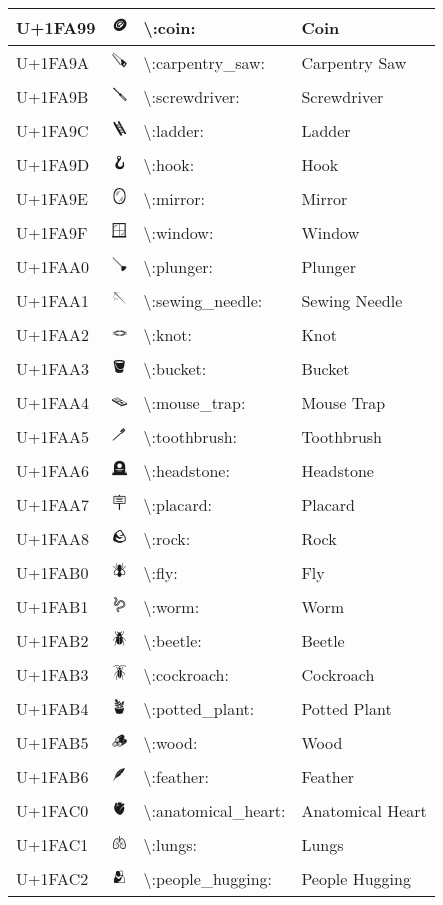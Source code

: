 \begin{table}[h]
\begin{tabulary}{\linewidth}{|L|L|L|L|}
\hline
U+1FA99 & 🪙 & {\textbackslash}:coin: & Coin \\
\hline
U+1FA9A & 🪚 & {\textbackslash}:carpentry\_saw: & Carpentry Saw \\
\hline
U+1FA9B & 🪛 & {\textbackslash}:screwdriver: & Screwdriver \\
\hline
U+1FA9C & 🪜 & {\textbackslash}:ladder: & Ladder \\
\hline
U+1FA9D & 🪝 & {\textbackslash}:hook: & Hook \\
\hline
U+1FA9E & 🪞 & {\textbackslash}:mirror: & Mirror \\
\hline
U+1FA9F & 🪟 & {\textbackslash}:window: & Window \\
\hline
U+1FAA0 & 🪠 & {\textbackslash}:plunger: & Plunger \\
\hline
U+1FAA1 & 🪡 & {\textbackslash}:sewing\_needle: & Sewing Needle \\
\hline
U+1FAA2 & 🪢 & {\textbackslash}:knot: & Knot \\
\hline
U+1FAA3 & 🪣 & {\textbackslash}:bucket: & Bucket \\
\hline
U+1FAA4 & 🪤 & {\textbackslash}:mouse\_trap: & Mouse Trap \\
\hline
U+1FAA5 & 🪥 & {\textbackslash}:toothbrush: & Toothbrush \\
\hline
U+1FAA6 & 🪦 & {\textbackslash}:headstone: & Headstone \\
\hline
U+1FAA7 & 🪧 & {\textbackslash}:placard: & Placard \\
\hline
U+1FAA8 & 🪨 & {\textbackslash}:rock: & Rock \\
\hline
U+1FAB0 & 🪰 & {\textbackslash}:fly: & Fly \\
\hline
U+1FAB1 & 🪱 & {\textbackslash}:worm: & Worm \\
\hline
U+1FAB2 & 🪲 & {\textbackslash}:beetle: & Beetle \\
\hline
U+1FAB3 & 🪳 & {\textbackslash}:cockroach: & Cockroach \\
\hline
U+1FAB4 & 🪴 & {\textbackslash}:potted\_plant: & Potted Plant \\
\hline
U+1FAB5 & 🪵 & {\textbackslash}:wood: & Wood \\
\hline
U+1FAB6 & 🪶 & {\textbackslash}:feather: & Feather \\
\hline
U+1FAC0 & 🫀 & {\textbackslash}:anatomical\_heart: & Anatomical Heart \\
\hline
U+1FAC1 & 🫁 & {\textbackslash}:lungs: & Lungs \\
\hline
U+1FAC2 & 🫂 & {\textbackslash}:people\_hugging: & People Hugging \\

\end{tabulary}
\end{table}
